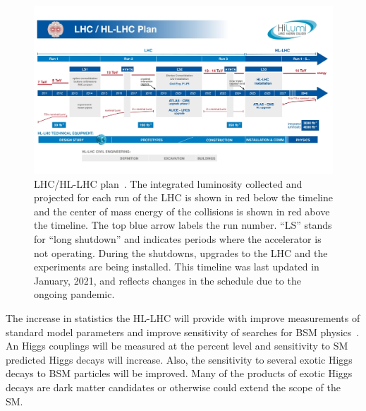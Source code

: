 \begin{figure}
    \centering
    \includegraphics[width = \textwidth]{figures/HL-LHC-updated-January-2021_small.jpg}
    \caption{LHC/HL-LHC plan~\cite{hl-lhc_plan_picture_website}. The integrated luminosity collected and projected for each run of the LHC is shown in red below the timeline and the center of mass energy of the collisions is shown in red above the timeline. The top blue arrow labels the run number. ``LS'' stands for ``long shutdown'' and indicates periods where the accelerator is not operating. During the shutdowns, upgrades to the LHC and the experiments are being installed. This timeline was last updated in January, 2021, and reflects changes in the schedule due to the ongoing pandemic. }
    \label{fig:hl-lhc}
\end{figure}

The increase in statistics the HL-LHC will provide with improve measurements of standard model parameters and improve sensitivity of searches for BSM physics~\cite{dainese_physics_2018}. An Higgs couplings will be measured at the percent level and sensitivity to SM predicted Higgs decays will increase. Also, the sensitivity to several exotic Higgs decays to BSM particles will be improved. Many of the products of exotic Higgs decays are dark matter candidates or otherwise could extend the scope of the SM.



